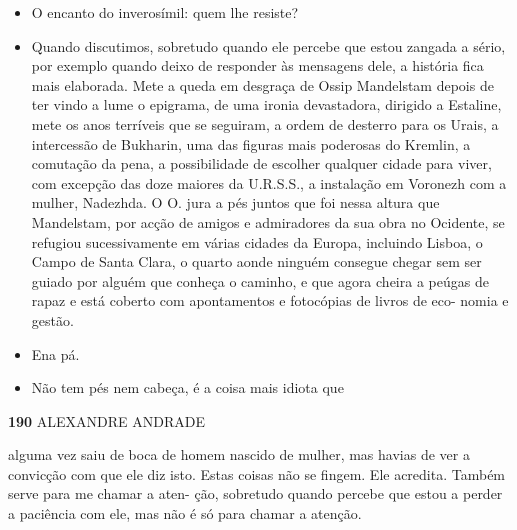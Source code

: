 \begin{itemize}
\tightlist
\item
  O encanto do inverosímil: quem lhe resiste?
\item
  Quando discutimos, sobretudo quando ele percebe que estou zangada a
  sério, por exemplo quando deixo de responder às mensagens dele, a
  história fica mais elaborada. Mete a queda em desgraça de Ossip
  Mandelstam depois de ter vindo a lume o epigrama, de uma ironia
  devastadora, dirigido a Estaline, mete os anos terríveis que se
  seguiram, a ordem de desterro para os Urais, a intercessão de
  Bukharin, uma das figuras mais poderosas do Kremlin, a comutação da
  pena, a possibilidade de escolher qualquer cidade para viver, com
  excepção das doze maiores da U.R.S.S., a instalação em Voronezh com a
  mulher, Nadezhda. O O. jura a pés juntos que foi nessa altura que
  Mandelstam, por acção de amigos e admiradores da sua obra no Ocidente,
  se refugiou sucessivamente em várias cidades da Europa, incluindo
  Lisboa, o Campo de Santa Clara, o quarto aonde ninguém consegue chegar
  sem ser guiado por alguém que conheça o caminho, e que agora cheira a
  peúgas de rapaz e está coberto com apontamentos e fotocópias de livros
  de eco- nomia e gestão.
\item
  Ena pá.
\item
  Não tem pés nem cabeça, é a coisa mais idiota que
\end{itemize}

\textbf{190 }ALEXANDRE ANDRADE

alguma vez saiu de boca de homem nascido de mulher, mas havias de ver a
convicção com que ele diz isto. Estas coisas não se fingem. Ele
acredita. Também serve para me chamar a aten- ção, sobretudo quando
percebe que estou a perder a paciência com ele, mas não é só para chamar
a atenção.

